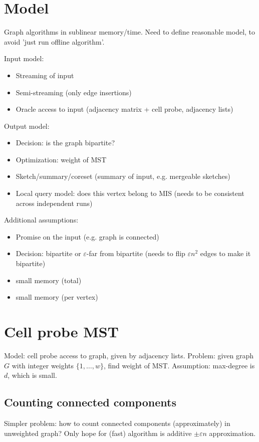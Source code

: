 \documentclass[11pt]{article}
\begin{document}


\section{Model}
Graph algorithms in sublinear memory/time. Need to define reasonable model, to avoid 'just run offline algorithm'.

Input model:
\begin{itemize}
\item Streaming of input
\item Semi-streaming (only edge insertions)
\item Oracle access to input (adjacency matrix + cell probe, adjacency lists)
\end{itemize}

Output model:
\begin{itemize}
\item Decision: is the graph bipartite?
\item Optimization: weight of MST
\item Sketch/summary/coreset (summary of input, e.g. mergeable sketches)
\item Local query model: does this vertex belong to MIS (needs to be consistent across independent runs)
\end{itemize}

Additional assumptions:
\begin{itemize}
\item Promise on the input (e.g. graph is connected)
\item Decision: bipartite or $\varepsilon$-far from bipartite (needs to flip $\varepsilon n^2$ edges to make it bipartite)
\item small memory (total)
\item small memory (per vertex)
\end{itemize}

\section{Cell probe MST}
Model: cell probe access to graph, given by adjacency lists. Problem: given graph $G$ with integer weights $\{1,\ldots,w\}$, find weight of MST. Assumption: max-degree is $d$, which is small.

\subsection{Counting connected components}
Simpler problem: how to count connected components (approximately) in unweighted graph?
Only hope for (fast) algorithm is additive $\pm \varepsilon n$ approximation.
\end{document}
